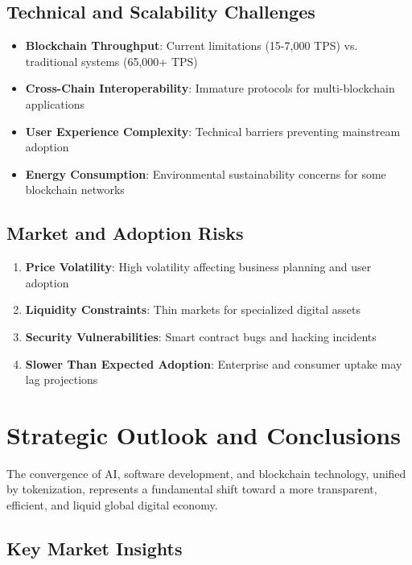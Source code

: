 \documentclass[11pt,a4paper]{report}
\begin{document}
\section{Technical and Scalability Challenges}

\begin{itemize}
    \item \textbf{Blockchain Throughput}: Current limitations (15-7,000 TPS) vs. traditional systems (65,000+ TPS)
    \item \textbf{Cross-Chain Interoperability}: Immature protocols for multi-blockchain applications
    \item \textbf{User Experience Complexity}: Technical barriers preventing mainstream adoption
    \item \textbf{Energy Consumption}: Environmental sustainability concerns for some blockchain networks
\end{itemize}

\section{Market and Adoption Risks}

\begin{enumerate}
    \item \textbf{Price Volatility}: High volatility affecting business planning and user adoption
    \item \textbf{Liquidity Constraints}: Thin markets for specialized digital assets
    \item \textbf{Security Vulnerabilities}: Smart contract bugs and hacking incidents
    \item \textbf{Slower Than Expected Adoption}: Enterprise and consumer uptake may lag projections
\end{enumerate}

\chapter{Strategic Outlook and Conclusions}

The convergence of AI, software development, and blockchain technology, unified by tokenization, represents a fundamental shift toward a more transparent, efficient, and liquid global digital economy.

\section{Key Market Insights}
\end{document}
